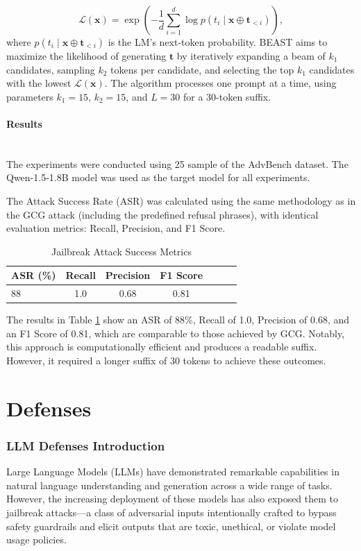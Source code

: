 \documentclass[../main.tex]{subfiles}
\begin{document}
\[
\mathcal{L}(\mathbf{x}) = \exp\left(-\frac{1}{d} \sum_{i=1}^d \log p(t_i \mid \mathbf{x} \oplus \mathbf{t}_{<i})\right),
\]
where \( p(t_i \mid \mathbf{x} \oplus \mathbf{t}_{<i}) \) is the LM's next-token probability. BEAST aims to maximize the likelihood of generating \(\mathbf{t}\) by iteratively expanding a beam of \( k_1 \) candidates, sampling \( k_2 \) tokens per candidate, and selecting the top \( k_1 \) candidates with the lowest \(\mathcal{L}(\mathbf{x})\). The algorithm processes one prompt at a time, using parameters \( k_1 = 15 \), \( k_2 = 15 \), and \( L = 30 \) for a 30-token suffix.

\paragraph{Results}\leavevmode\\
The experiments were conducted using 25 sample of the AdvBench dataset. The Qwen-1.5-1.8B model was used as the target model for all experiments.

The Attack Success Rate (ASR) was calculated using the same methodology as in the GCG attack (including the predefined refusal phrases), with identical evaluation metrics: Recall, Precision, and F1 Score.
\begin{table}[H]
\centering
\caption{Jailbreak Attack Success Metrics}
\label{tab:BEAST Attack success metrics}
\begin{tabular}{lcccccc}
\toprule
\textbf{ASR (\%)} & \textbf{Recall} & \textbf{Precision} & \textbf{F1 Score}\\
\midrule
    88 & 1.0  & 0.68 & 0.81  \\

\bottomrule
\end{tabular}
\end{table}

The results in Table \ref{tab:BEAST Attack success metrics} show an ASR of 88\%, Recall of 1.0, Precision of 0.68, and an F1 Score of 0.81, which are comparable to those achieved by GCG. Notably, this approach is computationally efficient and produces a readable suffix. However, it required a longer suffix of 30 tokens to achieve these outcomes.
\clearpage
\section{Defenses}

\subsubsection{LLM Defenses Introduction}
Large Language Models (LLMs) have demonstrated remarkable capabilities in natural language understanding and generation across a wide range of tasks. However, the increasing deployment of these models has also exposed them to jailbreak attacks—a class of adversarial inputs intentionally crafted to bypass safety guardrails and elicit outputs that are toxic, unethical, or violate model usage policies.
\end{document}
